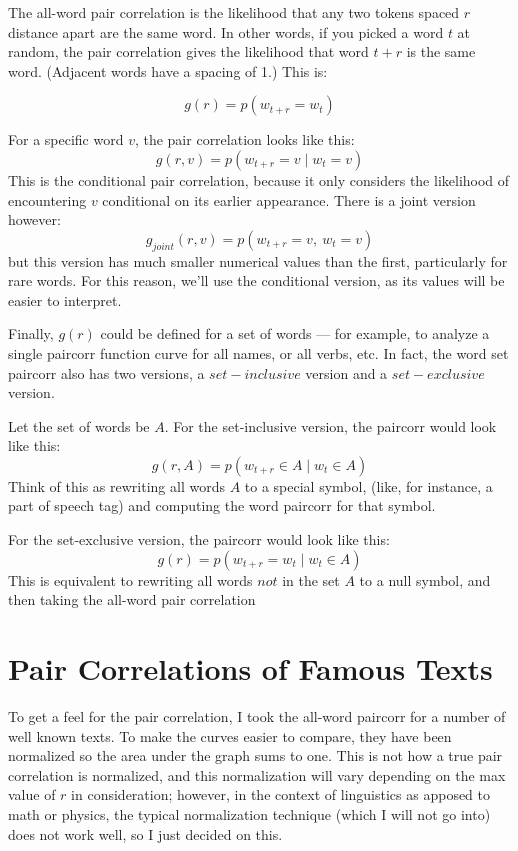\documentclass[11pt,letterpaper]{article}
\theoremstyle{definition}
\begin{document}
The all-word pair correlation is the likelihood that any two tokens spaced $r$ distance apart are the same word. In other words, if you picked a word $t$ at random, the pair correlation gives the likelihood that word $t+r$ is the same word. (Adjacent words have a spacing of 1.) This is:

\[ g(r) = p(w_{t+r} = w_{t}) \]

For a specific word $v$, the pair correlation looks like this:
\[ g(r,v) = p(w_{t+r} = v \mid  w_t = v) \]
This is the conditional pair correlation, because it only considers the likelihood of encountering $v$ conditional on its earlier appearance. There is a joint version however:
\[ g_{joint}(r,v) = p(w_{t+r} = v,\ w_t = v) \]
but this version has much smaller numerical values than the first, particularly for rare words. For this reason, we'll use the conditional version, as its values will be easier to interpret.

Finally, $g(r)$ could be defined for a set of words --- for example, to analyze a single paircorr function curve for all names, or all verbs, etc. In fact, the word set paircorr also has two versions, a $set-inclusive$ version and a $set-exclusive$ version.

Let the set of words be $A$. 
For the set-inclusive version, the paircorr would look like this:
\[ g(r,A) = p(w_{t+r} \in A \mid w_t \in A) \]
Think of this as rewriting all words $A$ to a special symbol, (like, for instance, a part of speech tag) and computing the word paircorr for that symbol.

For the set-exclusive version, the paircorr would look like this:
\[ g(r) = p(w_{t+r} = w_{t} \mid w_t \in A)  \]
This is equivalent to rewriting all words $not$ in the set $A$ to a null symbol, and then taking the all-word pair correlation

\section{Pair Correlations of Famous Texts}

To get a feel for the pair correlation, I took the all-word paircorr for a number of well known texts. To make the curves easier to compare, they have been normalized so the area under the graph sums to one. This is not how a true pair correlation is normalized, and this normalization will vary depending on the max value of $r$ in consideration; however, in the context of linguistics as apposed to math or physics, the typical normalization technique (which I will not go into) does not work well, so I just decided on this.
\end{document}
